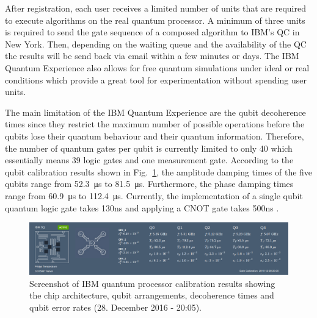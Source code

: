 After registration, each user receives a limited number of units that are required to execute algorithms on the real quantum processor. A minimum of three units is required to send the gate sequence of a composed algorithm to IBM's QC in New York. Then, depending on the waiting queue and the availability of the QC the results will be send back via email within a few minutes or days. The IBM Quantum Experience also allows for free quantum simulations under ideal or real conditions which provide a great tool for experimentation without spending user units.

The main limitation of the IBM Quantum Experience are the qubit decoherence times since they restrict the maximum number of possible operations before the qubits lose their quantum behaviour and their quantum information. Therefore, the number of quantum gates per qubit is currently limited to only 40 which essentially means 39 logic gates and one measurement gate. According to the qubit calibration results shown in Fig.~\ref{fig:calibration}, the amplitude damping times of the five qubits range from \SI{52.3}{\micro\second} to \SI{81.5}{\micro\second}. Furthermore, the phase damping times range from \SI{60.9}{\micro\second} to \SI{112.4}{\micro\second}. Currently, the implementation of a single qubit quantum logic gate takes 130ns and applying a CNOT gate takes 500ns \cite{ibmgatetimes}.

\begin{figure}[H]
      \centering
       \includegraphics[scale=0.33]{img/ibmcalibration.png}
       \caption[]{\label{fig:calibration} Screenshot of IBM quantum processor calibration results showing the chip architecture, qubit arrangements, decoherence times and qubit error rates (28. December 2016 - 20:05).\footnotemark[12]}
\end{figure}
